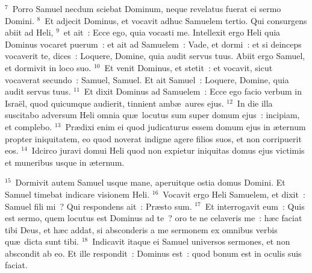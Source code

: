 ${}^{7}$~Porro Samuel necdum sciebat Dominum, neque revelatus fuerat ei sermo Domini.
${}^{8}$~Et adjecit Dominus, et vocavit adhuc Samuelem tertio. Qui consurgens abiit ad Heli,
${}^{9}$~et ait~: Ecce ego, quia vocasti me. Intellexit ergo Heli quia Dominus vocaret puerum~: et ait ad Samuelem~: Vade, et dormi~: et si deinceps vocaverit te, dices~: Loquere, Domine, quia audit servus tuus. Abiit ergo Samuel, et dormivit in loco suo.
${}^{10}$~Et venit Dominus, et stetit~: et vocavit, sicut vocaverat secundo~: Samuel, Samuel. Et ait Samuel~: Loquere, Domine, quia audit servus tuus.
${}^{11}$~Et dixit Dominus ad Samuelem~: Ecce ego facio verbum in Isra\"el, quod quicumque audierit, tinnient amb\ae\ aures ejus.
${}^{12}$~In die illa suscitabo adversum Heli omnia qu\ae\ locutus sum super domum ejus~: incipiam, et complebo.
${}^{13}$~Pr\ae dixi enim ei quod judicaturus essem domum ejus in \ae ternum propter iniquitatem, eo quod noverat indigne agere filios suos, et non corripuerit eos.
${}^{14}$~Idcirco juravi domui Heli quod non expietur iniquitas domus ejus victimis et muneribus usque in \ae ternum.


${}^{15}$~Dormivit autem Samuel usque mane, aperuitque ostia domus Domini. Et Samuel timebat indicare visionem Heli.
${}^{16}$~Vocavit ergo Heli Samuelem, et dixit~: Samuel fili mi~? Qui respondens ait~: Pr\ae sto sum.
${}^{17}$~Et interrogavit eum~: Quis est sermo, quem locutus est Dominus ad te~? oro te ne celaveris me~: h\ae c faciat tibi Deus, et h\ae c addat, si absconderis a me sermonem ex omnibus verbis qu\ae\ dicta sunt tibi.
${}^{18}$~Indicavit itaque ei Samuel universos sermones, et non abscondit ab eo. Et ille respondit~: Dominus est~: quod bonum est in oculis suis faciat.


